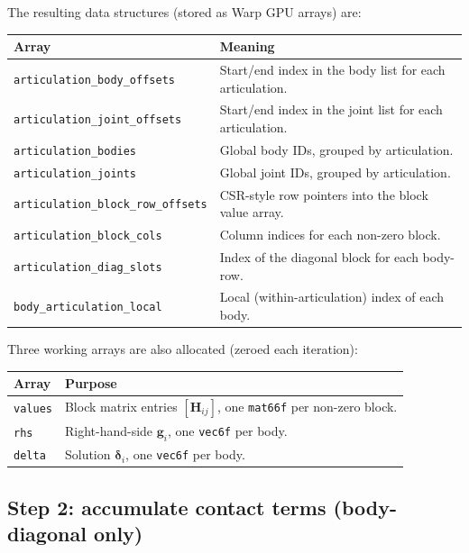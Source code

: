 \documentclass[11pt,a4paper]{article}
\begin{document}
The resulting data structures (stored as Warp GPU arrays) are:

\begin{center}
\begin{tabular}{lp{8.5cm}}
\toprule
Array & Meaning \\
\midrule
\texttt{articulation\_body\_offsets} & Start/end index in the body list for each articulation. \\
\texttt{articulation\_joint\_offsets} & Start/end index in the joint list for each articulation. \\
\texttt{articulation\_bodies} & Global body IDs, grouped by articulation. \\
\texttt{articulation\_joints} & Global joint IDs, grouped by articulation. \\
\texttt{articulation\_block\_row\_offsets} & CSR-style row pointers into the block value array. \\
\texttt{articulation\_block\_cols} & Column indices for each non-zero block. \\
\texttt{articulation\_diag\_slots} & Index of the diagonal block for each body-row. \\
\texttt{body\_articulation\_local} & Local (within-articulation) index of each body. \\
\bottomrule
\end{tabular}
\end{center}

Three working arrays are also allocated (zeroed each iteration):

\begin{center}
\begin{tabular}{ll}
\toprule
Array & Purpose \\
\midrule
\texttt{values} & Block matrix entries $[\mathbf{H}_{ij}]$, one \texttt{mat66f} per non-zero block. \\
\texttt{rhs}    & Right-hand-side $\mathbf{g}_i$, one \texttt{vec6f} per body. \\
\texttt{delta}  & Solution $\boldsymbol{\delta}_i$, one \texttt{vec6f} per body. \\
\bottomrule
\end{tabular}
\end{center}

\subsection{Step 2: accumulate contact terms (body-diagonal only)}
\label{sec:contacts}
\end{document}
